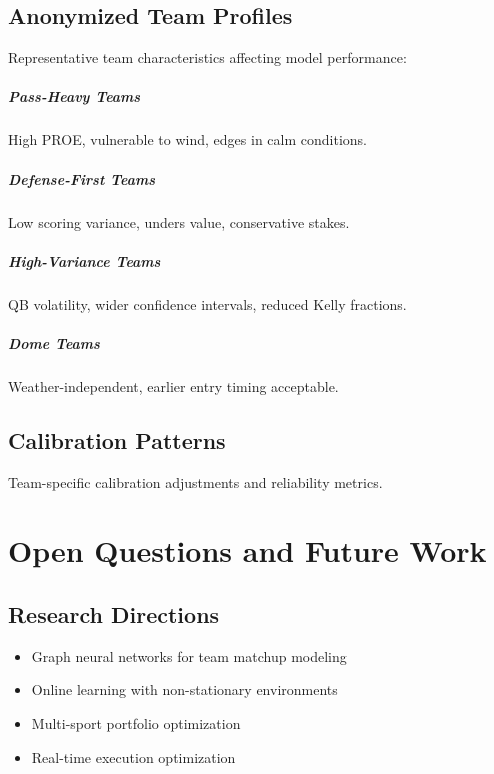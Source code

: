 \section{Anonymized Team Profiles}
Representative team characteristics affecting model performance:

\paragraph{Pass-Heavy Teams} High PROE, vulnerable to wind, edges in calm conditions.

\paragraph{Defense-First Teams} Low scoring variance, unders value, conservative stakes.

\paragraph{High-Variance Teams} QB volatility, wider confidence intervals, reduced Kelly fractions.

\paragraph{Dome Teams} Weather-independent, earlier entry timing acceptable.

\section{Calibration Patterns}
Team-specific calibration adjustments and reliability metrics.

\chapter{Open Questions and Future Work}

\section{Research Directions}
\begin{itemize}
  \item Graph neural networks for team matchup modeling
  \item Online learning with non-stationary environments
  \item Multi-sport portfolio optimization
  \item Real-time execution optimization
\end{itemize}

